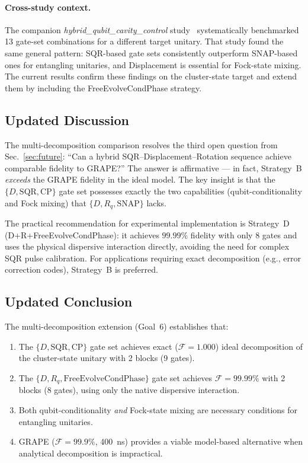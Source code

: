 \documentclass[aps,pra,twocolumn,reprint,floatfix,amsmath,amssymb]{revtex4-2}
\begin{document}
\paragraph{Cross-study context.}
The companion \textit{hybrid\_qubit\_cavity\_control}
study~\cite{cqed_sim} systematically benchmarked 13 gate-set
combinations for a different target unitary.  That study found
the same general pattern: SQR-based gate sets consistently
outperform SNAP-based ones for entangling unitaries, and
Displacement is essential for Fock-state mixing.  The current
results confirm these findings on the cluster-state target and
extend them by including the FreeEvolveCondPhase strategy.

\subsection{Updated Discussion}

The multi-decomposition comparison resolves the third open question
from Sec.~\ref{sec:future}: ``Can a hybrid SQR--Displacement--Rotation
sequence achieve comparable fidelity to GRAPE?''  The answer is
affirmative --- in fact, Strategy~B \emph{exceeds} the GRAPE fidelity
in the ideal model.  The key insight is that the $\{D, \mathrm{SQR},
\mathrm{CP}\}$ gate set possesses exactly the two capabilities
(qubit-conditionality and Fock mixing) that $\{D, R_q, \mathrm{SNAP}\}$
lacks.

The practical recommendation for experimental implementation is
Strategy~D (D+R+FreeEvolveCondPhase): it achieves $99.99\%$ fidelity
with only 8 gates and uses the physical dispersive interaction
directly, avoiding the need for complex SQR pulse calibration.
For applications requiring exact decomposition (e.g., error
correction codes), Strategy~B is preferred.

\subsection{Updated Conclusion}

The multi-decomposition extension (Goal~6) establishes that:
\begin{enumerate}
  \item The $\{D, \mathrm{SQR}, \mathrm{CP}\}$ gate set achieves
    exact ($\mathcal{F}=1.000$) ideal decomposition of the
    cluster-state unitary with 2 blocks (9 gates).
  \item The $\{D, R_q, \mathrm{FreeEvolveCondPhase}\}$ gate set
    achieves $\mathcal{F}=99.99\%$ with 2 blocks (8 gates),
    using only the native dispersive interaction.
  \item Both qubit-conditionality \emph{and} Fock-state mixing
    are necessary conditions for entangling unitaries.
  \item GRAPE ($\mathcal{F}=99.9\%$, \SI{400}{ns}) provides a
    viable model-based alternative when analytical decomposition
    is impractical.
\end{enumerate}
\end{document}
